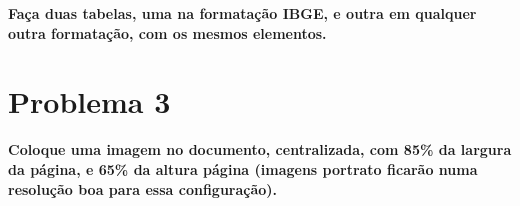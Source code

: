 \documentclass[a4paper,11pt, dvipdfmx]{abntex2}
\theoremstyle{mytheor}
\begin{document}
\textbf{Faça duas tabelas, uma na formatação IBGE, e outra em qualquer outra
formatação, com os mesmos elementos.}



\section*{Problema 3}

\textbf{Coloque uma imagem no documento, centralizada, com 85\% da
  largura da página, e 65\% da altura página (imagens portrato ficarão
  numa resolução boa para essa configuração).}
\end{document}
